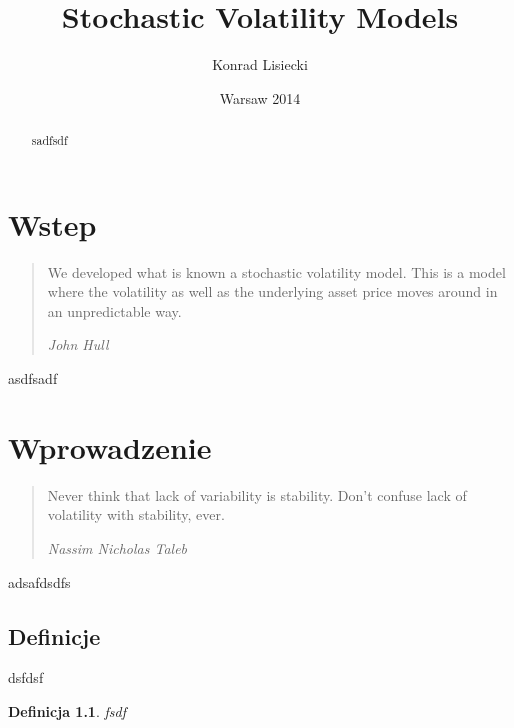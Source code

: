 \documentclass{pracamgr}
\author{Konrad Lisiecki}
\title{Stochastic Volatility Models}
\date{Warsaw 2014}
\newtheorem{defi}{Definicja}[section]
\begin{document}
\maketitle
\nocite{book-full}



 
\begin{abstract} 
sadfsdf
\end{abstract}

\tableofcontents






\chapter*{Wstep}

\begin{quote}

We developed what is known a stochastic volatility model. This is a model where the volatility as well as the underlying asset price moves around in an unpredictable way.

\raggedleft\slshape John Hull 
\end{quote}

  
asdfsadf





\chapter{Wprowadzenie}\label{r:pojecia}
\begin{quote}

Never think that lack of variability is stability. Don't confuse lack of volatility with stability, ever.
 
\raggedleft\slshape Nassim Nicholas Taleb 
\end{quote}
 


adsafdsdfs
 
\section{Definicje}
dsfdsf

\begin{defi}\label{aa}
fsdf
\end{defi}
\end{document}

